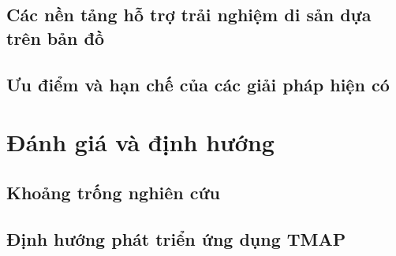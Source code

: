 \subsection{Các nền tảng hỗ trợ trải nghiệm di sản dựa trên bản đồ}
\subsection{Ưu điểm và hạn chế của các giải pháp hiện có}

\section{Đánh giá và định hướng}
\subsection{Khoảng trống nghiên cứu}
\subsection{Định hướng phát triển ứng dụng TMAP}
